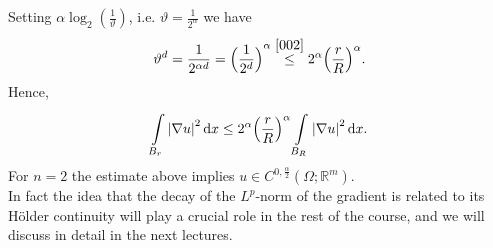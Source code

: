 Setting \(\alpha \log_{2}(\frac{1}{\vartheta})\), i.e. \(\vartheta = \frac{1}{2^{\alpha}}\) we have
\begin{gather}
	\vartheta^{d}= \frac{1}{2^{\alpha d}} = {\Big( \frac{1}{2^{d}} \Big)}^{\alpha} \overset{\eqref{002}}{\leq} 2^{\alpha}{\Big( \frac{r}{R} \Big)}^{\alpha}.
\end{gather}
Hence,
\begin{gather}
	\int\limits_{B_{r}}^{} \abs{\nabla u}^{2} \dd{x} \leq 2^{\alpha} {\Big( \frac{r}{R} \Big)}^{\alpha} \int\limits_{B_{R}}^{} \abs{\nabla u}^{2} \dd{x}.
\end{gather}
For \(n=2\) the estimate above implies \(u \in C^{0, \frac{\alpha}{2}}(\Omega; \mathbb{R}^{m})\).\\
In fact the idea that the decay of the \(L^{p}\)-norm of the gradient is related to its Hölder continuity will play a crucial role in the rest of the course, and we will discuss in detail in the next lectures.
